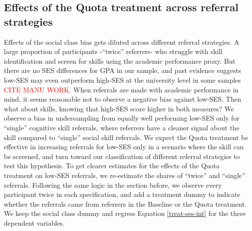 \documentclass[11pt,a4paper,oneside]{article}
\begin{document}
  \subsection*{Effects of the Quota treatment across referral strategies}
  Effects of the social class bias gets diluted across different referral strategies. A large proportion of participants -``twice'' referrers- who struggle with skill identification and screen for skills using the academic performance proxy. But there are no SES differences for GPA in our sample, and past evidence suggests low-SES may even outperform high-SES at the university level in some samples \textcolor{red}{CITE MANU WORK}. When referrals are made with academic performance in mind, it seems reasonable not to observe a negative bias against low-SES. Then what about skills, knowing that high-SES score higher in both measures? We observe a bias in undersampling from equally well performing low-SES only for ``single'' cognitive skill referrals, where referrers have a cleaner signal about the skill compared to ``single'' social skill referrals. We expect the Quota treatment be effective in increasing referrals for low-SES only in a scenario where the skill can be screened, and turn toward our classification of different referral strategies to test this hypothesis. To get clearer estimates for the effects of the Quota treatment on low-SES referrals, we re-estimate the shares of ``twice'' and ``single'' referrals. Following the same logic in the section before, we observe every participant twice in each specification, and add a treatment dummy to indicate whether the referrals came from referrers in the Baseline or the Quota treatment. We keep the social class dummy and regress Equation \ref{treat-ses-int} for the three dependent variables.
\end{document}
